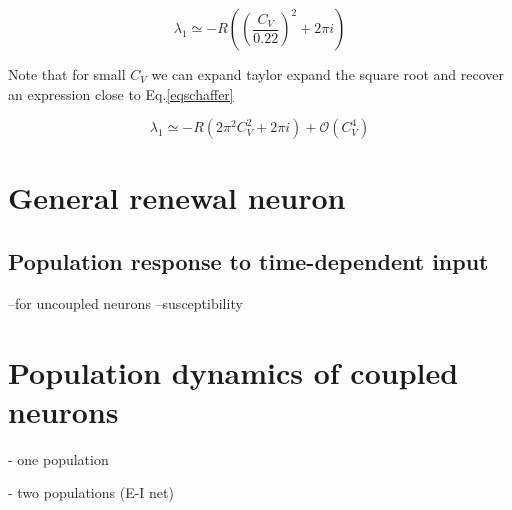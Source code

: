 \documentclass[a4paper,11pt,twoside]{article}
\numberwithin{equation}{section}
\begin{document}
\begin{equation}
\label{eqschaffer}
\lambda_1 \simeq -R\left( (\frac{C_V}{0.22})^2+2\pi i\right) 
\end{equation}

Note that for small $C_V$ we can expand taylor expand the square root and recover an expression close to Eq.\eqref{eqschaffer}

\begin{equation}
\label{eq:l1aprox2}
\lambda_1\simeq -R\left(2\pi^2 C_V^2+2\pi i\right) + \mathcal{O}(C_V^4)
\end{equation}




 



\section{General renewal neuron}
\label{sec:gen-renw}

\subsection{Population response to time-dependent input}

--for uncoupled neurons
--susceptibility

\section{Population dynamics of coupled neurons}

- one population

- two populations (E-I net)



\end{document}
